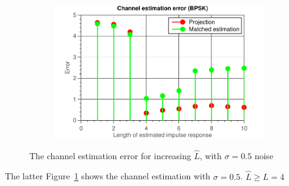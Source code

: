 \documentclass[11pt,titlepage]{report}
\begin{document}
\begin{figure}[H]
\begin{subfigure}{0.49\textwidth}
	\end{subfigure}
	\begin{subfigure}{0.49\textwidth}
		\includegraphics[width=\textwidth]{../../deliverable-7-resources/figures/ass-1/report-8-9-10/report-9-noise-0.5/ass-1-report-9-BPSK.pdf}
	\end{subfigure}
	\caption{The channel estimation error for increasing $\hat{L}$,  with $\sigma = 0.5$ noise}
	\label{fig:rep9-0.5}
\end{figure}

The latter Figure~\ref{fig:rep9-0.5} shows the channel estimation with $\sigma = 0.5$. $\hat{L} \ge L = 4$
\end{document}

